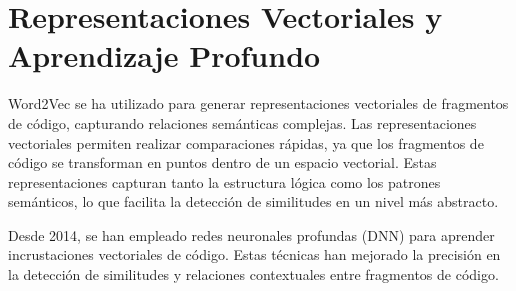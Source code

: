 \section{Representaciones Vectoriales y Aprendizaje Profundo}

Word2Vec se ha utilizado para generar representaciones vectoriales de fragmentos de código, capturando relaciones semánticas complejas. Las representaciones vectoriales permiten realizar comparaciones rápidas, ya que los fragmentos de código se transforman en puntos dentro de un espacio vectorial. Estas representaciones capturan tanto la estructura lógica como los patrones semánticos, lo que facilita la detección de similitudes en un nivel más abstracto.

Desde 2014, se han empleado redes neuronales profundas (DNN) para aprender incrustaciones vectoriales de código. Estas técnicas han mejorado la precisión en la detección de similitudes y relaciones contextuales entre fragmentos de código.
